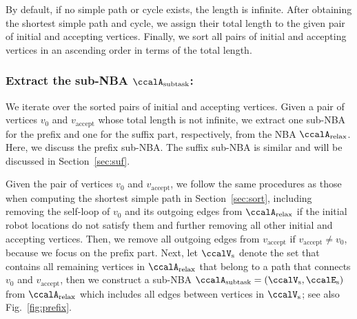 \documentclass[Afour,sageh,times]{sagej}
\newcommand{\auto}[1]{\ccalA_{\text{#1}}}
\newcommand{\vertex}[1]{v_{\text{#1}}}
\begin{document}
{  By default, if no simple path or cycle exists, the length is infinite. After obtaining the shortest simple path and cycle, we assign their total length to the given pair of initial and accepting vertices.  Finally,  we sort all pairs of initial and accepting vertices in an ascending order in terms of the total length.}


  \subsubsection{Extract the sub-NBA \upshape $\auto{subtask}$:}\label{sub-NBA:1}
We iterate over the sorted pairs of initial and accepting vertices. Given a pair of vertices  $v_0$ and $v_\text{accept}$ whose total length is not infinite,  we extract one sub-NBA for the prefix and one for the suffix part, respectively, from  the NBA $\auto{relax}$.  Here, we discuss the prefix sub-NBA. The suffix sub-NBA is similar and will be  discussed in Section~\ref{sec:suf}.

Given the pair of vertices $v_0$ and $\vertex{accept}$, we follow the same procedures as those when computing the shortest simple path in Section~\ref{sec:sort}, including removing the self-loop of $v_0$ and its outgoing edges from $\auto{relax}$ if the initial robot locations do not satisfy them and further removing all other initial and accepting vertices. Then, we remove all outgoing edges from $v_{\text{accept}}$ if $v_{\text{accept}} \not=v_0$, because we focus on the prefix part. Next, let $\ccalV_{\text{s}}$ denote the set that contains all remaining vertices in $ \auto{relax}$ that belong to a path that connects $v_0$ and $v_{\text{accept}}$, then we construct a sub-NBA $\auto{subtask}=(\ccalV_{\text{s}}, \ccalE_\text{s})$ from $\auto{relax}$ which includes all edges between vertices in $\ccalV_{\text{s}}$; see also Fig.~\ref{fig:prefix}. %
\end{document}
